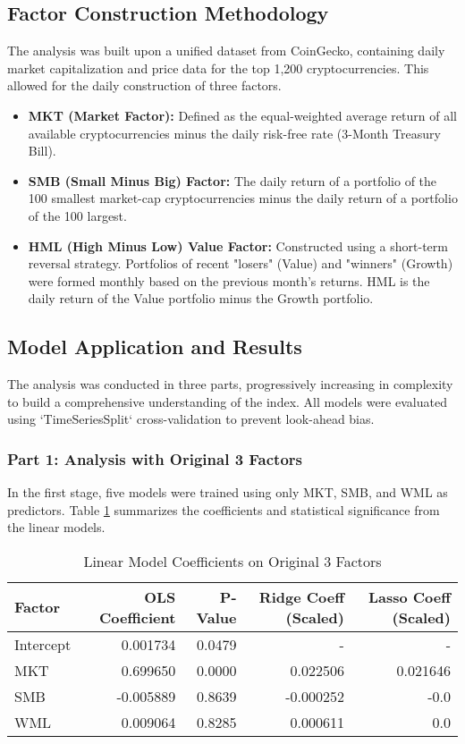 \documentclass[12pt]{article}
\begin{document}
\subsection{Factor Construction Methodology}
The analysis was built upon a unified dataset from CoinGecko, containing daily market capitalization and price data for the top 1,200 cryptocurrencies. This allowed for the daily construction of three factors.

\begin{itemize}
    \item \textbf{MKT (Market Factor):} Defined as the equal-weighted average return of all available cryptocurrencies minus the daily risk-free rate (3-Month Treasury Bill).
    \item \textbf{SMB (Small Minus Big) Factor:} The daily return of a portfolio of the 100 smallest market-cap cryptocurrencies minus the daily return of a portfolio of the 100 largest.
    \item \textbf{HML (High Minus Low) Value Factor:} Constructed using a short-term reversal strategy. Portfolios of recent "losers" (Value) and "winners" (Growth) were formed monthly based on the previous month's returns. HML is the daily return of the Value portfolio minus the Growth portfolio.
\end{itemize}

\subsection{Model Application and Results}
The analysis was conducted in three parts, progressively increasing in complexity to build a comprehensive understanding of the index. All models were evaluated using `TimeSeriesSplit` cross-validation to prevent look-ahead bias.

\subsubsection{Part 1: Analysis with Original 3 Factors}
In the first stage, five models were trained using only MKT, SMB, and WML as predictors. Table \ref{tab:3factor_coeffs} summarizes the coefficients and statistical significance from the linear models.

\begin{table}[H]
    \centering
    \caption{Linear Model Coefficients on Original 3 Factors}
    \label{tab:3factor_coeffs}
    \begin{tabular}{lrrrr}
        \hline
        \textbf{Factor} & \textbf{OLS Coefficient} & \textbf{P-Value} & \textbf{Ridge Coeff (Scaled)} & \textbf{Lasso Coeff (Scaled)} \\
        \hline
        Intercept & 0.001734 & 0.0479 & - & - \\
        MKT & 0.699650 & 0.0000 & 0.022506 & 0.021646 \\
        SMB & -0.005889 & 0.8639 & -0.000252 & -0.0 \\
        WML & 0.009064 & 0.8285 & 0.000611 & 0.0 \\
        \hline
    \end{tabular}
\end{table}
\end{document}

